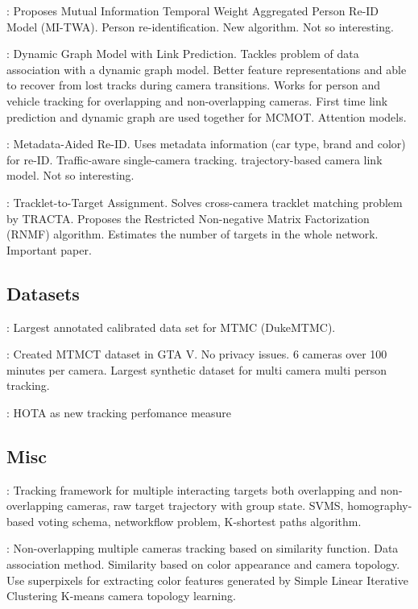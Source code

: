 \cite{Li22b}: Proposes Mutual Information Temporal Weight Aggregated Person Re-ID Model (MI-TWA). Person re-identification. New algorithm. Not so interesting.

\cite{Quach21}: Dynamic Graph Model with Link Prediction. Tackles problem of data association with a dynamic graph model. Better feature representations and able to recover from lost tracks during camera transitions. Works for person and vehicle tracking for overlapping and non-overlapping cameras. First time link prediction and dynamic graph are used together for MCMOT. Attention models.

\cite{Hsu21}: Metadata-Aided Re-ID. Uses metadata information (car type, brand and color) for re-ID. Traffic-aware single-camera tracking. trajectory-based camera link model. Not so interesting.

\cite{He20a}: Tracklet-to-Target Assignment. Solves cross-camera tracklet matching problem by TRACTA. Proposes the Restricted Non-negative Matrix Factorization (RNMF) algorithm. Estimates the number of targets in the whole network. Important paper.

\subsection{Datasets}

\cite{Ristani16}: Largest annotated calibrated data set for MTMC (DukeMTMC).

\cite{Koehl20}: Created MTMCT dataset in GTA V. No privacy issues. 6 cameras over 100 minutes per camera. Largest synthetic dataset for multi camera multi person tracking.

\cite{Luiten20}: HOTA as new tracking perfomance measure

\subsection{Misc}

\cite{Zhang15a}: Tracking framework for multiple interacting targets both overlapping and non-overlapping cameras, raw target trajectory with group state. SVMS, homography-based voting schema, networkflow problem, K-shortest paths algorithm.

\cite{Choi16}: Non-overlapping multiple cameras tracking based on similarity function. Data association method. Similarity based on color appearance and camera topology. Use superpixels for extracting color features generated by Simple Linear Iterative Clustering K-means camera topology learning.

